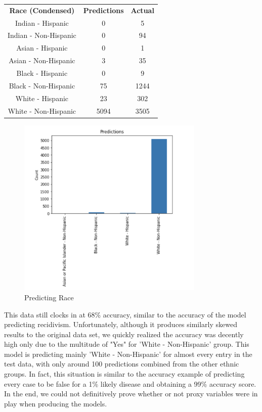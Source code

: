 \documentclass[11pt, sigconf]{acmart}
\begin{document}
\begin{tabular}{|c|c|c|}
\textbf{Race (Condensed)} & \textbf{Predictions} & \textbf{Actual} \\
 Indian  - Hispanic& 0 & 5 \\
Indian - Non-Hispanic& 0 & 94 \\
 Asian - Hispanic& 0 & 1\\
 Asian  - Non-Hispanic& 3 & 35\\
 Black - Hispanic&0 & 9 \\
 Black - Non-Hispanic& 75 &1244\\ 
 White - Hispanic& 23& 302 \\
 White - Non-Hispanic &5094&3505\\
\end{tabular}

\begin{figure}[h] 	
\centering
\includegraphics[width=3.5in]{4.png}
\caption{Predicting Race}
\end{figure}

This data still clocks in at 68\% accuracy, similar to the accuracy of the model predicting recidivism. Unfortunately, although it produces similarly skewed results to the original data set, we quickly realized the accuracy was decently high only due to the multitude of "Yes" for 'White - Non-Hispanic' group. This model is predicting mainly 'White - Non-Hispanic' for almost every entry in the test data, with only around 100 predictions combined from the other ethnic groups. In fact, this situation is similar to the accuracy example of predicting every case to be false for a 1\% likely disease and obtaining a 99\% accuracy score. In the end, we could not definitively prove whether or not proxy variables were in play when producing the models.
\end{document}
